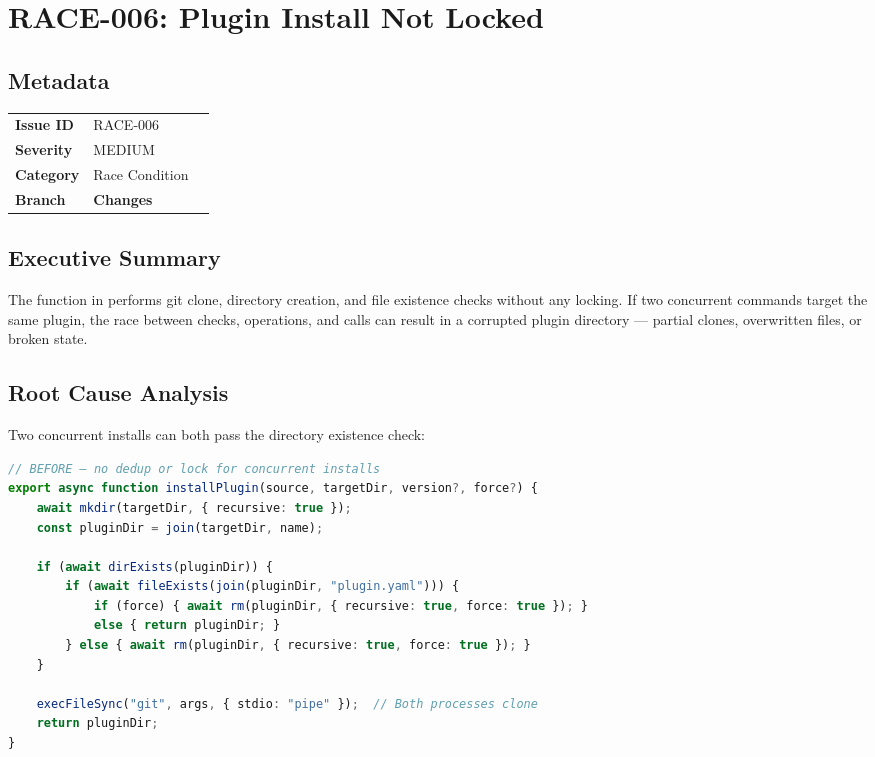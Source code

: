 \section{RACE-006: Plugin Install Not Locked}
\label{sec:race-006}
\subsection*{Metadata}
\begin{tabular}{ll}
\textbf{Issue ID} & RACE-006 \\
\textbf{Severity} & MEDIUM \\
\textbf{Category} & Race Condition \\
\textbf{Branch} & 
\textbf{Changes} &  \\
\end{tabular}

\subsection*{Executive Summary}
The  function in  performs git clone, directory creation, and file existence checks without any locking. If two concurrent  commands target the same plugin, the race between  checks,  operations, and  calls can result in a corrupted plugin directory — partial clones, overwritten files, or broken  state.

\subsection*{Root Cause Analysis}
Two concurrent installs can both pass the directory existence check:

\begin{lstlisting}[language=TypeScript]
// BEFORE — no dedup or lock for concurrent installs
export async function installPlugin(source, targetDir, version?, force?) {
    await mkdir(targetDir, { recursive: true });
    const pluginDir = join(targetDir, name);

    if (await dirExists(pluginDir)) {
        if (await fileExists(join(pluginDir, "plugin.yaml"))) {
            if (force) { await rm(pluginDir, { recursive: true, force: true }); }
            else { return pluginDir; }
        } else { await rm(pluginDir, { recursive: true, force: true }); }
    }

    execFileSync("git", args, { stdio: "pipe" });  // Both processes clone
    return pluginDir;
}
\end{lstlisting}

